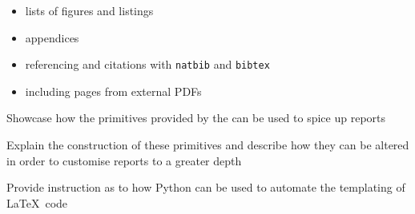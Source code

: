 \begin{methodology0}
\begin{itemize}
      \item lists of figures and listings
      \item appendices
      \item referencing and citations with \texttt{natbib} and \texttt{bibtex}
      \item including pages from external PDFs
    \end{itemize}
  \item Showcase how the primitives provided by the \uswdwmspkg{} can be used to spice up reports
  \item Explain the construction of these primitives and describe how they can be altered in order to customise reports to a greater depth
  \item Provide instruction as to how Python can be used to automate the templating of \LaTeX\ code
\end{methodology0}
